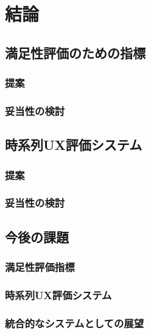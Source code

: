 \chapter{結論}
\label{chap:conclusion}

\section{満足性評価のための指標}

\subsection{提案}

\subsection{妥当性の検討}

\section{時系列UX評価システム}

\subsection{提案}

\subsection{妥当性の検討}

\section{今後の課題}

\subsection{満足性評価指標}

\subsection{時系列UX評価システム}

\subsection{統合的なシステムとしての展望}


